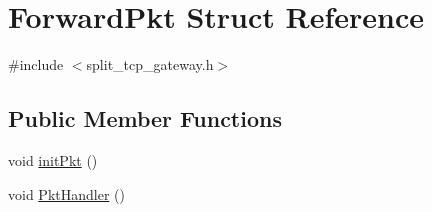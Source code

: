 \hypertarget{structForwardPkt}{\section{\-Forward\-Pkt \-Struct \-Reference}
\label{structForwardPkt}
}


{\ttfamily \#include $<$split\-\_\-tcp\-\_\-gateway.\-h$>$}

\subsection*{\-Public \-Member \-Functions}
\begin{DoxyCompactItemize}
\item 
void \hyperlink{structForwardPkt_ad8118c5246082b33c4149f401781e5c9}{init\-Pkt} ()
\item 
void \hyperlink{structForwardPkt_a1c697108f36471281da14897a4f887b6}{\-Pkt\-Handler} ()
\end{DoxyCompactItemize}
